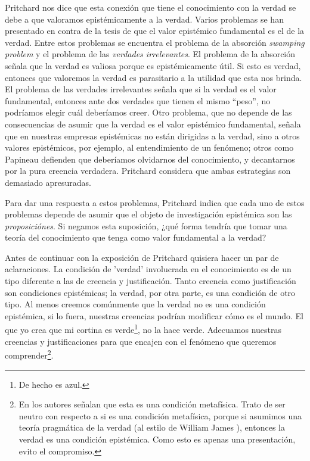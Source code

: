 \documentclass[12pt]{article}
\begin{document}
Pritchard nos dice que esta conexión que tiene el conocimiento con la verdad se debe a que valoramos epistémicamente a la verdad. Varios problemas se han presentado en contra de la tesis de que el valor epistémico fundamental es el de la verdad. Entre estos problemas se encuentra el problema de la absorción \textit{swamping problem} y el problema de las \textit{verdades irrelevantes}. El problema de la absorción señala que la verdad es valiosa porque es epistémicamente útil. Si esto es verdad, entonces que valoremos la verdad es parasitario a la utilidad que esta nos brinda. El problema de las verdades irrelevantes señala que si la verdad es el valor fundamental, entonces ante dos verdades que tienen el mismo ``peso'', no podríamos elegir cuál deberíamos creer. Otro problema, que no depende de las consecuencias de asumir que la verdad es el valor epistémico fundamental, señala que en nuestras empresas epistémicas no están dirigidas a la verdad, sino a otros valores epistémicos, por ejemplo, al entendimiento de un fenómeno; otros como Papineau \cite{Papineau2021} defienden que deberíamos olvidarnos del conocimiento, y decantarnos por la pura creencia verdadera. Pritchard considera que ambas estrategias son demasiado apresuradas.

Para dar una respuesta a estos problemas, Pritchard indica que cada uno de estos problemas depende de asumir que el objeto de investigación epistémica son las \textit{proposiciónes}. Si negamos esta suposición, ¿qué forma tendría que tomar una teoría del conocimiento que tenga como valor fundamental a la verdad?

Antes de continuar con la exposición de Pritchard quisiera hacer un par de aclaraciones. La condición de 'verdad' involucrada en el conocimiento es de un tipo diferente a las de creencia y justificación. Tanto creencia como justificación son condiciones epistémicas; la verdad, por otra parte, es una condición de otro tipo. Al menos creemos comúnmente que la verdad no es una condición epistémica, si lo fuera, nuestras creencias podrían modificar cómo es el mundo. El que yo crea que mi cortina es verde\footnote{De hecho es azul.}, no la hace verde. Adecuamos nuestras creencias y justificaciones para que encajen con el fenómeno que queremos comprender\footnote{En \cite{sep-knowledge-analysis} los autores señalan que esta es una condición metafísica. Trato de ser neutro con respecto a si es una condición metafísica, porque si asumimos una teoría pragmática de la verdad (al estilo de William James ), entonces la verdad es una condición epistémica. Como esto es apenas una presentación, evito el compromiso.}.  
\end{document}
